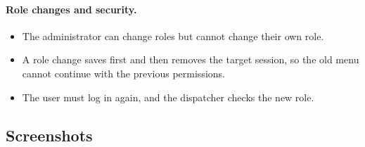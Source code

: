 \documentclass[11pt,a4paper]{article}
\begin{document}
\paragraph{Role changes and security.}
\begin{itemize}
\item The administrator can change roles but cannot change their own role.
\item A role change saves first and then removes the target session, so the old menu cannot continue with the previous permissions.
\item The user must log in again, and the dispatcher checks the new role.
\end{itemize}

\subsection{Screenshots}

\setlength{\intextsep}{6pt}
\setlength{\abovecaptionskip}{3pt}
\setlength{\belowcaptionskip}{0pt}
\end{document}
